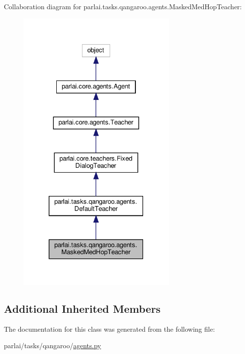 Collaboration diagram for parlai.\+tasks.\+qangaroo.\+agents.\+Masked\+Med\+Hop\+Teacher\+:
\nopagebreak
\begin{figure}[H]
\begin{center}
\leavevmode
\includegraphics[width=225pt]{classparlai_1_1tasks_1_1qangaroo_1_1agents_1_1MaskedMedHopTeacher__coll__graph}
\end{center}
\end{figure}
\subsection*{Additional Inherited Members}


The documentation for this class was generated from the following file\+:\begin{DoxyCompactItemize}
\item 
parlai/tasks/qangaroo/\hyperlink{parlai_2tasks_2qangaroo_2agents_8py}{agents.\+py}\end{DoxyCompactItemize}
